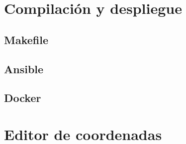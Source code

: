 \section{Compilación y despliegue}

\subsection{Makefile}

\subsection{Ansible}

\subsection{Docker}


\section{Editor de coordenadas}

